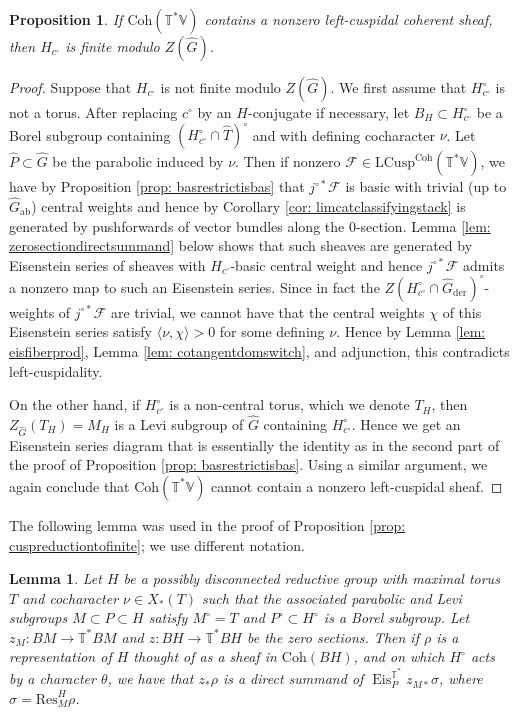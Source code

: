 \documentclass{amsart}
\newtheorem{lemma}[theorem]{Lemma}
\newtheorem{proposition}[theorem]{Proposition}
\theoremstyle{definition}
\theoremstyle{remark}
\numberwithin{equation}{section}
\newcommand{\der}{\mathrm{der}}
\newcommand{\mc}{\mathcal}
\newcommand{\ab}{\mathrm{ab}}
\newcommand{\Res}{\mathrm{Res}}
\newcommand{\wh}{\widehat}
\DeclareMathOperator{\Eis}{\mathrm{Eis}}
\newcommand{\Coh}{\mathrm{Coh}}
\newcommand{\LCusp}{\mathrm{LCusp}}
\newcommand{\V}{\mathbb{V}}
\newcommand{\T}{\mathbb{T}}
\begin{document}
\begin{proposition}{\label{prop: cuspreductiontofinite}}
    If $\Coh(\T^{\ast}\V)$ contains a nonzero left-cuspidal coherent sheaf, then $H_{c^{\circ}}$ is finite modulo $Z(\wh{G})$.
\end{proposition}
\begin{proof}
Suppose that $H_{c^{\circ}}$ is not finite modulo $Z(\wh G)$. We first assume that $H_{c^{\circ}}^\circ$ is not a torus. After replacing $c^\circ$ by an $H$-conjugate if necessary, let $B_H \subset H^{\circ}_{c^{\circ}}$ be a Borel subgroup containing $(H^{\circ}_{c^{\circ}}\cap \wh T)^\circ$ and with defining cocharacter $\nu$. Let $\wh{P} \subset \wh{G}$ be the parabolic induced by $\nu$. Then if nonzero $\mc{F} \in \LCusp^\Coh(\T^{\ast}\V)$, we have by Proposition \ref{prop: basrestrictisbas} that $j^{\circ \ast}\mc{F}$ is basic with trivial (up to $\wh{G}_{\ab}$) central weights and hence by Corollary \ref{cor: limcatclassifyingstack} is generated by pushforwards of vector bundles along the $0$-section. Lemma \ref{lem: zerosectiondirectsummand} below shows that such sheaves are generated by Eisenstein series of sheaves with $H_{c^{\circ}}$-basic central weight and hence $j^{\circ \ast}\mc{F}$ admits a nonzero map to such an Eisenstein series. Since in fact the $Z(H^{\circ}_{c^{\circ}} \cap \wh{G}_{\der})^{\circ}$-weights of $j^{\circ \ast}\mc{F}$ are trivial, we cannot have that the central weights $\chi$ of this Eisenstein series satisfy $\langle \nu, \chi \rangle > 0$ for some defining $\nu$. Hence by Lemma \ref{lem: eisfiberprod}, Lemma \ref{lem: cotangentdomswitch}, and adjunction, this contradicts left-cuspidality.

On the other hand, if $H^{\circ}_{c^{\circ}}$ is a non-central torus, which we denote $T_H$, then $Z_{\wh{G}}(T_H) = M_H$ is a Levi subgroup of $\wh{G}$ containing $H^{\circ}_{c^{\circ}}$. Hence we get an Eisenstein series diagram that is essentially the identity as in the second part of the proof of Proposition \ref{prop: basrestrictisbas}. Using a similar argument, we again conclude that $\Coh(\T^{\ast}\V)$ cannot contain a nonzero left-cuspidal sheaf.
\end{proof}

The following lemma was used in the proof of Proposition \ref{prop: cuspreductiontofinite}; we use different notation. 

\begin{lemma}{\label{lem: zerosectiondirectsummand}}
Let $H$ be a possibly disconnected reductive group with maximal torus $T$ and cocharacter $\nu \in X_{\ast}(T)$ such that the associated parabolic and Levi subgroups $M \subset P \subset H$ satisfy $M^{\circ}=T$ and $P^{\circ} \subset H^{\circ}$ is a Borel subgroup. Let $z_M: BM \rightarrow \T^{\ast}BM$ and $z: BH \rightarrow \T^{\ast}BH$ be the zero sections. Then if $\rho$ is a representation of $H$ thought of as a sheaf in $\Coh(BH)$, and on which $H^{\circ}$ acts by a character $\theta$, we have that $z_{\ast} \rho$ is a direct summand of $\Eis^{\T^{\ast}}_P z_{M \ast} \sigma$, where $\sigma = \Res^{H}_{M}\rho$.
\end{lemma}
\end{document}
